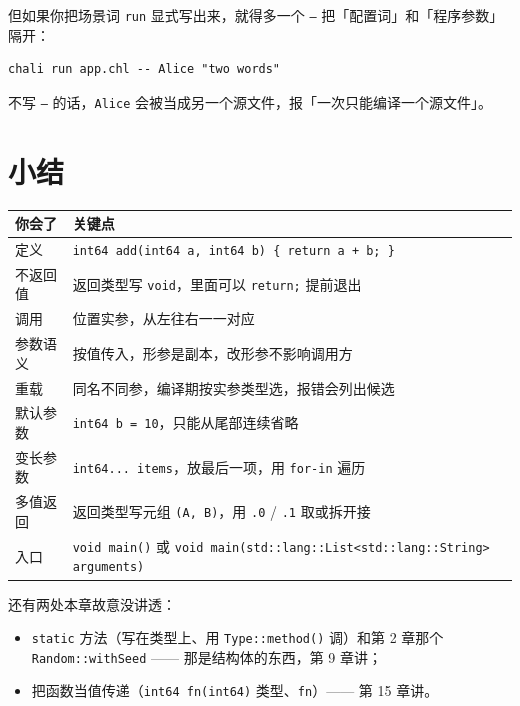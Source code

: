 但如果你把场景词 \texttt{run} 显式写出来，就得多一个 \texttt{--} 把「配置词」和「程序参数」隔开：

\par
\medskip
\begin{lstlisting}[style=sh]
chali run app.chl -- Alice "two words"
\end{lstlisting}
\par
\medskip

不写 \texttt{--} 的话，\texttt{Alice} 会被当成另一个源文件，报「一次只能编译一个源文件」。

\section{小结}

\begin{center}
\begin{tabular}{ll}
\toprule
你会了 & 关键点 \\
\midrule
定义 & \texttt{int64 add(\allowbreak{}int64 a,\allowbreak{} int64 b)\allowbreak{} \{ return a + b; \}} \\
不返回值 & 返回类型写 \texttt{void}，里面可以 \texttt{return;} 提前退出 \\
调用 & 位置实参，从左往右一一对应 \\
参数语义 & 按值传入，形参是副本，改形参不影响调用方 \\
重载 & 同名不同参，编译期按实参类型选，报错会列出候选 \\
默认参数 & \texttt{int64 b =\allowbreak{} 10}，只能从尾部连续省略 \\
变长参数 & \texttt{int64.\allowbreak{}.\allowbreak{}.\allowbreak{} items}，放最后一项，用 \texttt{for-in} 遍历 \\
多值返回 & 返回类型写元组 \texttt{(\allowbreak{}A,\allowbreak{} B)\allowbreak{}}，用 \texttt{.\allowbreak{}0} / \texttt{.\allowbreak{}1} 取或拆开接 \\
入口 & \texttt{void main(\allowbreak{})\allowbreak{}} 或 \texttt{void main(\allowbreak{}std:\allowbreak{}:\allowbreak{}lang:\allowbreak{}:\allowbreak{}List<\allowbreak{}std:\allowbreak{}:\allowbreak{}lang:\allowbreak{}:\allowbreak{}String>\allowbreak{} arguments)\allowbreak{}} \\
\bottomrule
\end{tabular}
\end{center}

还有两处本章故意没讲透：

\begin{itemize}

\item \texttt{static} 方法（写在类型上、用 \texttt{Type:\allowbreak{}:\allowbreak{}method(\allowbreak{})\allowbreak{}} 调）和第 2 章那个\texttt{Random:\allowbreak{}:\allowbreak{}with\allowbreak{}Seed} —— 那是结构体的东西，第 9 章讲；

\item 把函数当值传递（\texttt{int64 fn(\allowbreak{}int64)\allowbreak{}} 类型、\texttt{fn}）—— 第 15 章讲。

\end{itemize}

